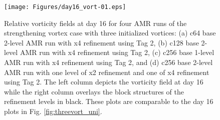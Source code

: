 \documentclass{ametsoc}
\begin{document}
\begin{figure}
   \centerline{%
   \noindent
   \texttt{[image: Figures/day16\_vort-01.eps]}}
   \caption{Relative vorticity fields at day 16 for four AMR runs of the strengthening
   vortex case with three initialized vortices: 
   (a) c64 base 2-level AMR run with x4 refinement using Tag 2,
   (b) c128 base 2-level AMR run with x4 refinement using Tag 2,
   (c) c256 base 1-level AMR run with x4 refinement using Tag 2,
   and (d) c256 base 2-level AMR run with one level of x2 refinement 
   and one of x4 refinement using Tag 2. The left column depicts the vorticity 
   field at day 16 while the right column overlays
   the block structures of the refinement levels in black. These plots
   are comparable to the day 16 plots in Fig. \ref{fig:threevort_uni}.
   }
   \label{fig:vort_amr_day16}
\end{figure}
\end{document}
